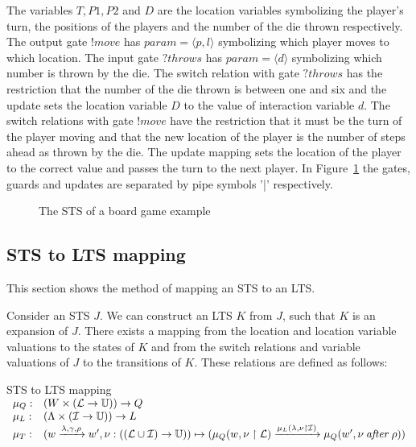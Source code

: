 The variables $T, P1, P2$ and $D$ are the location variables symbolizing the player's turn, the positions of the players and the number of the die thrown respectively. The output gate $!move$ has $param = \langle p, l\rangle$ symbolizing which player moves to which location. The input gate $\mathit{?throws}$ has $\mathit{param} = \langle d\rangle$ symbolizing which number is thrown by the die. The switch relation with gate $\mathit{?throws}$ has the restriction that the number of the die thrown is between one and six and the update sets the location variable $D$ to the value of interaction variable $d$. The switch relations with gate $!move$ have the restriction that it must be the turn of the player moving and that the new location of the player is the number of steps ahead as thrown by the die. The update mapping sets the location of the player to the correct value and passes the turn to the next player. In Figure~\ref{fig:example_sts} the gates, guards and updates are separated by pipe symbols '|' respectively.

\begin{figure}[ht]
  \begin{center}
    
  \end{center}
  \caption{The STS of a board game example}
  \label{fig:example_sts}
\end{figure}

\subsection{STS to LTS mapping}\label{sec:sts_lts_trafo}
This section shows the method of mapping an STS to an LTS.

Consider an STS $J$. We can construct an LTS $K$ from $J$, such that $K$ is an expansion of $J$. There exists a mapping from the location and location variable valuations to the states of $K$ and from the switch relations and variable valuations of $J$ to the transitions of $K$. These relations are defined as follows:
\vspace{5px}
\begin{definition} STS to LTS mapping \\
$\begin{array}{ll}
\mu_Q: & (W \times (\mathcal{L} \rightarrow \mathbb{U})) \rightarrow Q \\
\mu_L: & (\Lambda \times (\mathcal{I} \rightarrow \mathbb{U})) \rightarrow L \\
\mu_T: & (w\xrightarrow{\lambda,\gamma,\rho}w', \nu: ((\mathcal{L} \cup \mathcal{I}) \rightarrow \mathbb{U})) \mapsto (\mu_Q(w, \nu \restriction \mathcal{L}) \xrightarrow{\mu_L(\lambda, \nu \restriction\mathcal{I})} \mu_Q(w', \nu\:\mathit{after}\:\rho))
\end{array}$
\end{definition}


